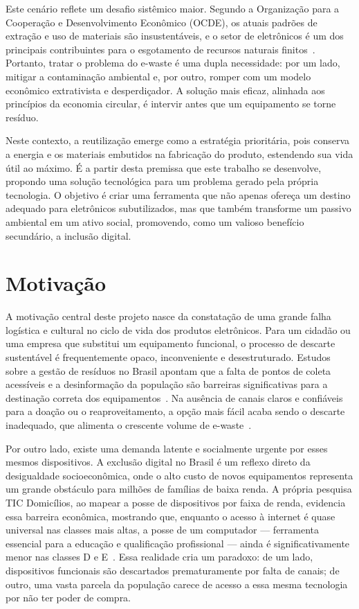 \documentclass[
	12pt,				%
	openright,			%
	oneside,			%
	a4paper,			%
	english,			%
	brazil				%
	]{abntex2}
\theoremstyle{definition}
\begin{document}
Este cenário reflete um desafio sistêmico maior. Segundo a Organização para a Cooperação e Desenvolvimento Econômico (OCDE), os atuais padrões de extração e uso de materiais são insustentáveis, e o setor de eletrônicos é um dos principais contribuintes para o esgotamento de recursos naturais finitos~\cite{oecd2019}. Portanto, tratar o problema do e-waste é uma dupla necessidade: por um lado, mitigar a contaminação ambiental e, por outro, romper com um modelo econômico extrativista e desperdiçador. A solução mais eficaz, alinhada aos princípios da economia circular, é intervir antes que um equipamento se torne resíduo.

Neste contexto, a reutilização emerge como a estratégia prioritária, pois conserva a energia e os materiais embutidos na fabricação do produto, estendendo sua vida útil ao máximo. É a partir desta premissa que este trabalho se desenvolve, propondo uma solução tecnológica para um problema gerado pela própria tecnologia. O objetivo é criar uma ferramenta que não apenas ofereça um destino adequado para eletrônicos subutilizados, mas que também transforme um passivo ambiental em um ativo social, promovendo, como um valioso benefício secundário, a inclusão digital.

\section[Motivação]{Motivação}

A motivação central deste projeto nasce da constatação de uma grande falha logística e cultural no ciclo de vida dos produtos eletrônicos. Para um cidadão ou uma empresa que substitui um equipamento funcional, o processo de descarte sustentável é frequentemente opaco, inconveniente e desestruturado. Estudos sobre a gestão de resíduos no Brasil apontam que a falta de pontos de coleta acessíveis e a desinformação da população são barreiras significativas para a destinação correta dos equipamentos~\cite{GreenEletron2022}. Na ausência de canais claros e confiáveis para a doação ou o reaproveitamento, a opção mais fácil acaba sendo o descarte inadequado, que alimenta o crescente volume de e-waste~\cite{forti2024}.

Por outro lado, existe uma demanda latente e socialmente urgente por esses mesmos dispositivos. A exclusão digital no Brasil é um reflexo direto da desigualdade socioeconômica, onde o alto custo de novos equipamentos representa um grande obstáculo para milhões de famílias de baixa renda. A própria pesquisa TIC Domicílios, ao mapear a posse de dispositivos por faixa de renda, evidencia essa barreira econômica, mostrando que, enquanto o acesso à internet é quase universal nas classes mais altas, a posse de um computador — ferramenta essencial para a educação e qualificação profissional — ainda é significativamente menor nas classes D e E~\cite{cgi2024}. Essa realidade cria um paradoxo: de um lado, dispositivos funcionais são descartados prematuramente por falta de canais; de outro, uma vasta parcela da população carece de acesso a essa mesma tecnologia por não ter poder de compra.
\end{document}
